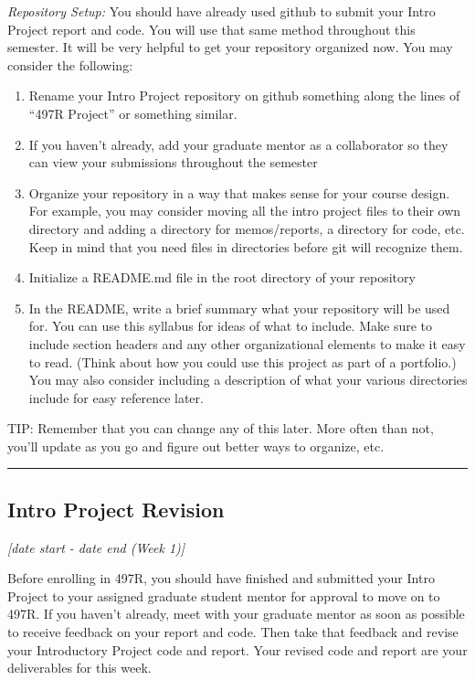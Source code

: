 \documentclass[12pt]{article}
\begin{document}
\textit{Repository Setup:} You should have already used github to submit your Intro Project report and code. You will use that same method throughout this semester.
It will be very helpful to get your repository organized now.
You may consider the following:

\begin{enumerate}
	\item Rename your Intro Project repository on github something along the lines of ``497R Project'' or something similar.
	\item If you haven't already, add your graduate mentor as a collaborator so they can view your submissions throughout the semester
	\item Organize your repository in a way that makes sense for your course design. For example, you may consider moving all the intro project files to their own directory and adding a directory for memos/reports, a directory for code, etc.  Keep in mind that you need files in directories before git will recognize them.
	\item Initialize a README.md file in the root directory of your repository
	\item In the README, write a brief summary what your repository will be used for.  You can use this syllabus for ideas of what to include.  Make sure to include section headers and any other organizational elements to make it easy to read. (Think about how you could use this project as part of a portfolio.) You may also consider including a description of what your various directories include for easy reference later.
\end{enumerate}

\noindent TIP:  Remember that you can change any of this later.
More often than not, you'll update as you go and figure out better ways to organize, etc.



\vspace{1em}\hrule\vspace{1em}
\subsection{Intro Project Revision}
\label{ssec:ipr}

\textit{[date start - date end (Week 1)]}

\bigskip

Before enrolling in 497R, you should have finished and submitted your Intro Project to your assigned graduate student mentor for approval to move on to 497R.
If you haven't already, meet with your graduate mentor as soon as possible to receive feedback on your report and code.  Then take that feedback and revise your Introductory Project code and report.  Your revised code and report are your deliverables for this week.
\end{document}
